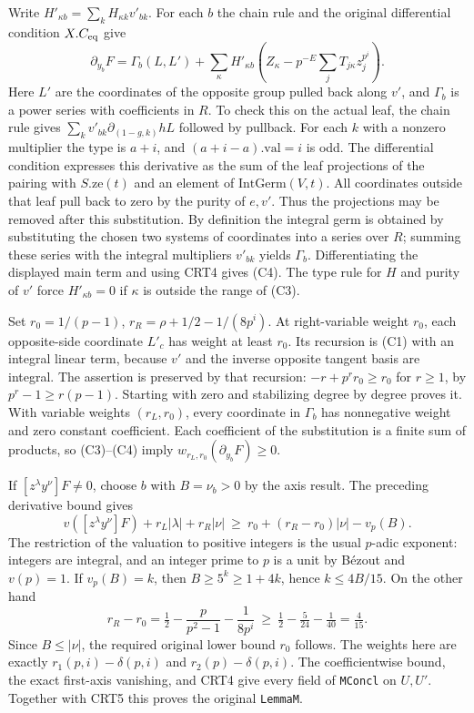 Write $H'_{\kappa b}=\sum_k H_{\kappa k}v'_{bk}$. For each $b$ the
chain rule and the original differential condition $X.C_{\rm eq}$
give
\[
 \partial_{y_b}F=\Gamma_b(L,L')+
 \sum_{\kappa}H'_{\kappa b}
 \left(Z_\kappa-p^{-E}\sum_jT_{j\kappa}z_j^{p^i}\right).       \tag{C4}
\]
Here $L'$ are the coordinates of the opposite group pulled back along
$v'$, and $\Gamma_b$ is a power series with coefficients in $R$.
To check this on the actual leaf, the chain rule gives
$\sum_kv'_{bk}\partial_{(1-g,k)}hL$ followed by pullback.
For each $k$ with a nonzero multiplier the type is $a+i$, and
$(a+i-a).\mathrm{val}=i$ is odd. The differential condition expresses
this derivative as the sum of the leaf projections of the pairing
with $S.\mathrm{ze}(t)$ and an element of $\mathrm{IntGerm}(V,t)$.
All coordinates outside that leaf pull back to zero by the purity of
$e,v'$. Thus the projections may be removed after this substitution.
By definition the integral germ is obtained by substituting the
chosen two systems of coordinates into a series over $R$; summing
these series with the integral multipliers $v'_{bk}$ yields $\Gamma_b$.
Differentiating the displayed main term and using CRT4 gives (C4).
The type rule for $H$ and purity of $v'$ force $H'_{\kappa b}=0$
if $\kappa$ is outside the range of (C3).

Set $r_0=1/(p-1)$, $r_R=\rho+1/2-1/(8p^i)$. At right-variable
weight $r_0$, each opposite-side coordinate $L'_c$ has weight at
least $r_0$. Its recursion is (C1) with an integral linear term,
because $v'$ and the inverse opposite tangent basis are integral.
The assertion is preserved by that recursion:
$-r+p^r r_0\ge r_0$ for $r\ge1$, by $p^r-1\ge r(p-1)$.
Starting with zero and stabilizing degree by degree proves it.
With variable weights $(r_L,r_0)$, every coordinate in
$\Gamma_b$ has nonnegative weight and zero constant coefficient.
Each coefficient of the substitution is a finite sum of products,
so (C3)--(C4) imply $w_{r_L,r_0}(\partial_{y_b}F)\ge0$.

If $[z^\lambda y^\nu]F\ne0$, choose $b$ with $B=\nu_b>0$
by the axis result. The preceding derivative bound gives
\[
 v([z^\lambda y^\nu]F)+r_L|\lambda|+r_R|\nu|
 \ \ge\ r_0+(r_R-r_0)|\nu|-v_p(B).
\]
The restriction of the valuation to positive integers is the usual
$p$-adic exponent: integers are integral, and an integer prime to $p$
is a unit by B\'ezout and $v(p)=1$. If $v_p(B)=k$, then
$B\ge5^k\ge1+4k$, hence $k\le 4B/15$. On the other hand
\[
 r_R-r_0=\tfrac12-\frac{p}{p^2-1}-\frac1{8p^i}
 \ \ge\ \tfrac12-\tfrac5{24}-\tfrac1{40}=\tfrac4{15}.
\]
Since $B\le|\nu|$, the required original lower bound $r_0$ follows.
The weights here are exactly $r_1(p,i)-\delta(p,i)$ and
$r_2(p)-\delta(p,i)$. The coefficientwise bound, the exact first-axis
vanishing, and CRT4 give every field of \texttt{MConcl} on $U,U'$.
Together with CRT5 this proves the original \texttt{LemmaM}.

